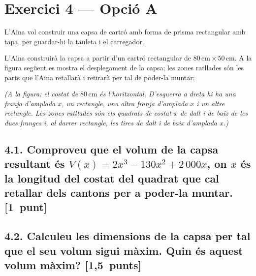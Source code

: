 \documentclass[11pt,a4paper]{article}
\begin{document}
\section*{\textcolor{blauPista}{Exercici 4 --- Opció A}}

\noindent L'Aina vol construir una capsa de cartró amb forma de prisma rectangular amb tapa, per guardar-hi la tauleta i el carregador.

\noindent L'Aina construirà la capsa a partir d'un cartró rectangular de $80\,\text{cm} \times 50\,\text{cm}$. A la figura següent es mostra el desplegament de la capsa; les zones ratllades són les parts que l'Aina retallarà i retirarà per tal de poder-la muntar:

\noindent\textit{(A la figura: el costat de $80\,\text{cm}$ és l'horitzontal. D'esquerra a dreta hi ha una franja d'amplada $x$, un rectangle, una altra franja d'amplada $x$ i un altre rectangle. Les zones ratllades són els quadrats de costat $x$ de dalt i de baix de les dues franges i, al darrer rectangle, les tires de dalt i de baix d'amplada $x$.)}

\subsection*{4.1. \normalfont Comproveu que el volum de la capsa resultant és $V(x) = 2x^{3} - 130x^{2} + 2\,000x$, on $x$ és la longitud del costat del quadrat que cal retallar dels cantons per a poder-la muntar. \hspace*{\fill}\textnormal{[1~punt]}}


\subsection*{4.2. \normalfont Calculeu les dimensions de la capsa per tal que el seu volum sigui màxim. Quin és aquest volum màxim? \hspace*{\fill}\textnormal{[1,5~punts]}}
\end{document}
